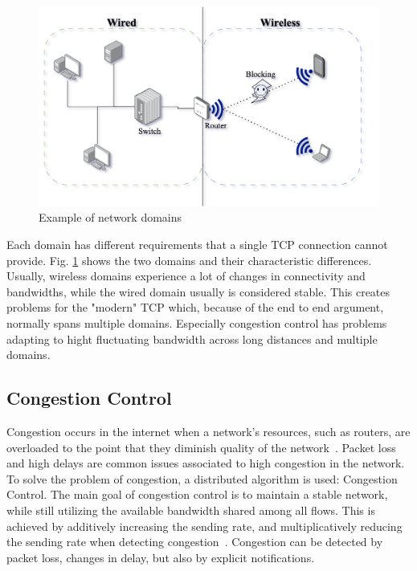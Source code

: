 \documentclass[a4paper,english, 11pt]{report}
\begin{document}
\begin{figure}[h] %
	\centering
	\includegraphics[scale=0.65]{../diagrams/drawio/domains.png}
  	\caption{Example of network domains}
  	\label{fig:domains}
\end{figure}

Each domain has different requirements that a single TCP connection cannot provide. Fig. \ref{fig:domains} shows the two domains and their characteristic differences. Usually, wireless domains experience a lot of changes in connectivity and bandwidths, while the wired domain usually is considered stable. This creates problems for the "modern" TCP which, because of the end to end argument, normally spans multiple domains. Especially congestion control has problems adapting to hight fluctuating bandwidth across long distances and multiple domains.

\subsection{Congestion Control}
Congestion occurs in the internet when a network's resources, such as routers, are overloaded to the point that they diminish quality of the network~\cite{rfc6077}. Packet loss and high delays are common issues associated to high congestion in the network. To solve the problem of congestion, a distributed algorithm is used: Congestion Control. The main goal of congestion control is to maintain a stable network, while still utilizing the available bandwidth shared among all flows. This is achieved by additively increasing the sending rate, and multiplicatively reducing the sending rate when detecting congestion~\cite{welzl_congestion}. Congestion can be detected by packet loss, changes in delay, but also by explicit notifications.\\
\end{document}
